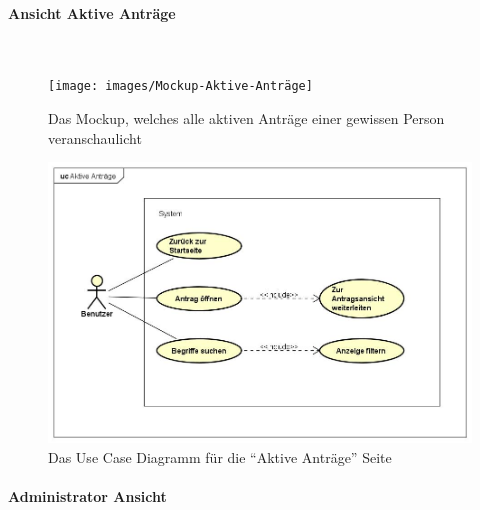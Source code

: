 \paragraph{Ansicht Aktive Anträge}
~\\

\begin{figure}[H]
	\centering
	\texttt{[image: images/Mockup-Aktive-Anträge]}
	\caption[Mokup aktive Anträge]{Das Mockup, welches alle aktiven Anträge einer gewissen Person veranschaulicht}
	\label{fig:mockupAktive}
\end{figure}
\begin{figure}[H]
	\centering
	\includegraphics[width=1\linewidth]{images/uc-active}
	\caption[Use Case Diagramm Aktive Anträge]{Das Use Case Diagramm für die \enquote{Aktive Anträge} Seite}
	\label{fig:ucAktiv}
\end{figure}
\paragraph{Administrator Ansicht}
~\\

